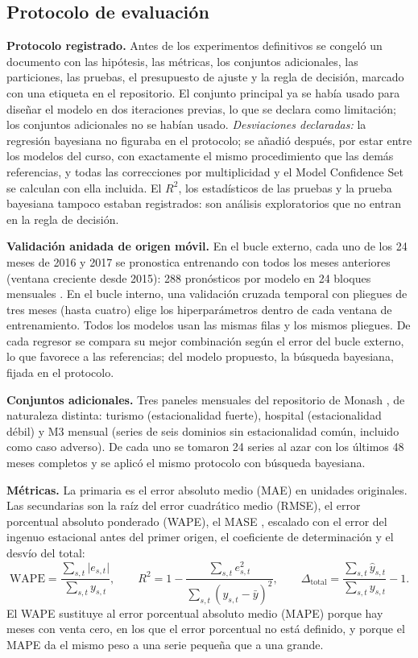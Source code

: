 \documentclass[pdflatex,sn-mathphys-num]{sn-jnl}
\theoremstyle{thmstyleone}
\begin{document}
\subsection{Protocolo de evaluación}\label{subsec:evaluacion}

\textbf{Protocolo registrado.} Antes de los experimentos definitivos se congeló un documento con las hipótesis, las métricas, los conjuntos adicionales, las particiones, las pruebas, el presupuesto de ajuste y la regla de decisión, marcado con una etiqueta en el repositorio. El conjunto principal ya se había usado para diseñar el modelo en dos iteraciones previas, lo que se declara como limitación; los conjuntos adicionales no se habían usado. \emph{Desviaciones declaradas:} la regresión bayesiana no figuraba en el protocolo; se añadió después, por estar entre los modelos del curso, con exactamente el mismo procedimiento que las demás referencias, y todas las correcciones por multiplicidad y el Model Confidence Set se calculan con ella incluida. El $R^2$, los estadísticos de las pruebas y la prueba bayesiana tampoco estaban registrados: son análisis exploratorios que no entran en la regla de decisión.

\textbf{Validación anidada de origen móvil.} En el bucle externo, cada uno de los 24 meses de 2016 y 2017 se pronostica entrenando con todos los meses anteriores (ventana creciente desde 2015): 288 pronósticos por modelo en 24 bloques mensuales \cite{cerqueira2020}. En el bucle interno, una validación cruzada temporal con pliegues de tres meses (hasta cuatro) elige los hiperparámetros dentro de cada ventana de entrenamiento. Todos los modelos usan las mismas filas y los mismos pliegues. De cada regresor se compara su mejor combinación según el error del bucle externo, lo que favorece a las referencias; del modelo propuesto, la búsqueda bayesiana, fijada en el protocolo.

\textbf{Conjuntos adicionales.} Tres paneles mensuales del repositorio de Monash \cite{godahewa2021}, de naturaleza distinta: turismo (estacionalidad fuerte), hospital (estacionalidad débil) y M3 mensual (series de seis dominios sin estacionalidad común, incluido como caso adverso). De cada uno se tomaron 24 series al azar con los últimos 48 meses completos y se aplicó el mismo protocolo con búsqueda bayesiana.

\textbf{Métricas.} La primaria es el error absoluto medio (MAE) en unidades originales. Las secundarias son la raíz del error cuadrático medio (RMSE), el error porcentual absoluto ponderado (WAPE), el MASE \cite{hyndman2006}, escalado con el error del ingenuo estacional antes del primer origen, el coeficiente de determinación y el desvío del total:
\begin{equation}
\mathrm{WAPE}=\frac{\sum_{s,t}\lvert e_{s,t}\rvert}{\sum_{s,t}y_{s,t}},\qquad
R^2=1-\frac{\sum_{s,t}e_{s,t}^2}{\sum_{s,t}(y_{s,t}-\bar{y})^2},\qquad
\Delta_{\mathrm{total}}=\frac{\sum_{s,t}\hat{y}_{s,t}}{\sum_{s,t}y_{s,t}}-1.
\label{eq:metricas}
\end{equation}
El WAPE sustituye al error porcentual absoluto medio (MAPE) porque hay meses con venta cero, en los que el error porcentual no está definido, y porque el MAPE da el mismo peso a una serie pequeña que a una grande.
\end{document}
